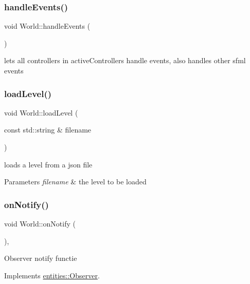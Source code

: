 \subsubsection{\texorpdfstring{handle\+Events()}{handleEvents()}}
{\footnotesize\ttfamily void World\+::handle\+Events (\begin{DoxyParamCaption}{ }\end{DoxyParamCaption})}

lets all controllers in active\+Controllers handle events, also handles other sfml events \mbox{\label{classWorld_a6a08c827c3a0def12b7700211353735f}} 
\subsubsection{\texorpdfstring{load\+Level()}{loadLevel()}}
{\footnotesize\ttfamily void World\+::load\+Level (\begin{DoxyParamCaption}\item[{const std\+::string \&}]{filename }\end{DoxyParamCaption})}

loads a level from a json file 
\begin{DoxyParams}{Parameters}
{\em filename} & the level to be loaded \\
\hline
\end{DoxyParams}
\mbox{\label{classWorld_a91c2d7b127190f17a6cd85743245fb5b}} 
\subsubsection{\texorpdfstring{on\+Notify()}{onNotify()}}
{\footnotesize\ttfamily void World\+::on\+Notify (\begin{DoxyParamCaption}{ }\end{DoxyParamCaption})\hspace{0.3cm}{\ttfamily [override]}, {\ttfamily [virtual]}}

Observer notify functie 

Implements \hyperlink{classentities_1_1Observer}{entities\+::\+Observer}.

\mbox{\label{classWorld_a5cc73b1aa54db5da01e4004acd4fd8bb}} 
